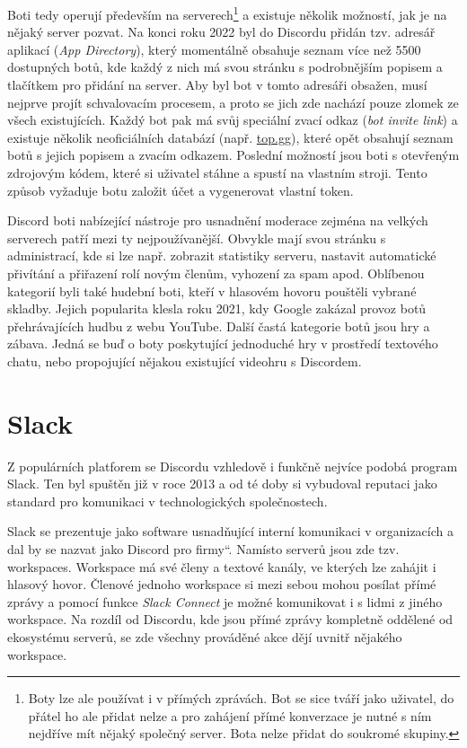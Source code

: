 \documentclass[FM]{tulthesis}
\begin{document}
	Boti tedy operují především na serverech\footnote{Boty lze ale používat i v přímých zprávách. Bot se sice tváří jako uživatel, do přátel ho ale přidat nelze a pro zahájení přímé konverzace je nutné s ním nejdříve mít nějaký společný server. Bota nelze přidat do soukromé skupiny.} a existuje několik možností, jak je na nějaký server pozvat. Na konci roku 2022 byl do Discordu přidán tzv. adresář aplikací (\textit{App Directory}), který momentálně obsahuje seznam více než 5500 dostupných botů, kde každý z nich má svou stránku s podrobnějším popisem a tlačítkem pro přidání na server. Aby byl bot v tomto adresáři obsažen, musí nejprve projít schvalovacím procesem, a proto se jich zde nachází pouze zlomek ze všech existujících. Každý bot pak má svůj speciální zvací odkaz (\textit{bot invite link}) a existuje několik neoficiálních databází (např. \href{https://top.gg}{top.gg}), které opět obsahují seznam botů s jejich popisem a zvacím odkazem. Poslední možností jsou boti s otevřeným zdrojovým kódem, které si uživatel stáhne a spustí na vlastním stroji. Tento způsob vyžaduje botu založit účet a vygenerovat vlastní token.
	
	Discord boti nabízející nástroje pro usnadnění moderace zejména na velkých serverech patří mezi ty nejpoužívanější. Obvykle mají svou stránku s administrací, kde si lze např. zobrazit statistiky serveru, nastavit automatické přivítání a přiřazení rolí novým členům, vyhození za spam apod. Oblíbenou kategorií byli také hudební boti, kteří v hlasovém hovoru pouštěli vybrané skladby. Jejich popularita klesla roku 2021, kdy Google zakázal provoz botů přehrávajících hudbu z webu \mbox{YouTube}. Další častá kategorie botů jsou hry a zábava. Jedná se buď o boty poskytující jednoduché hry v prostředí textového chatu, nebo propojující nějakou existující videohru s Discordem.
	
	\section{Slack}
	
	Z populárních platforem se Discordu vzhledově i funkčně nejvíce podobá program Slack. Ten byl spuštěn již v roce 2013 a od té doby si vybudoval reputaci jako standard pro komunikaci v technologických společnostech. \cite{lit_Discord}
	
	Slack se prezentuje jako software usnadňující interní komunikaci v organizacích a dal by se nazvat jako \quotedblbase Discord pro firmy\textquotedblleft. Namísto serverů jsou zde tzv. workspaces. Workspace má své členy a textové kanály, ve kterých lze zahájit i hlasový hovor. Členové jednoho workspace si mezi sebou mohou posílat přímé zprávy a pomocí funkce \textit{Slack Connect} je možné komunikovat i s lidmi z jiného workspace. Na rozdíl od Discordu, kde jsou přímé zprávy kompletně oddělené od ekosystému serverů, se zde všechny prováděné akce dějí uvnitř nějakého workspace.
	
\end{document}

